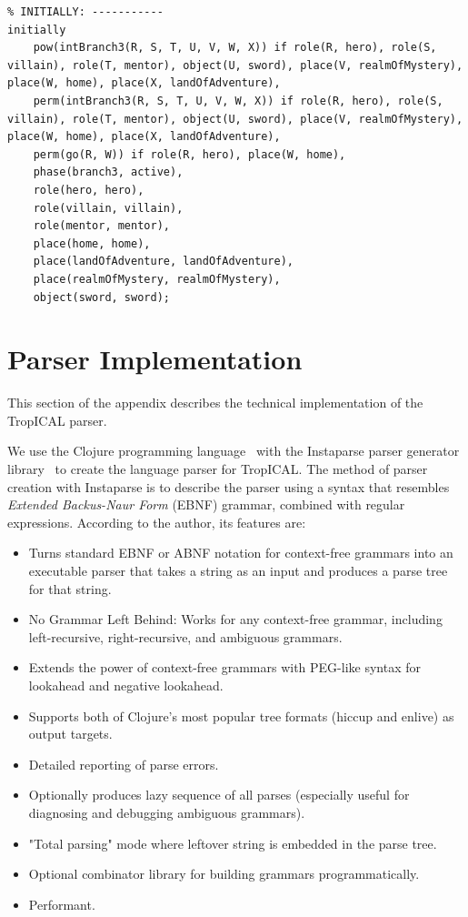 \documentclass[11pt]{report}
\begin{document}
\begin{lstlisting}
% INITIALLY: -----------
initially
    pow(intBranch3(R, S, T, U, V, W, X)) if role(R, hero), role(S, villain), role(T, mentor), object(U, sword), place(V, realmOfMystery), place(W, home), place(X, landOfAdventure),
    perm(intBranch3(R, S, T, U, V, W, X)) if role(R, hero), role(S, villain), role(T, mentor), object(U, sword), place(V, realmOfMystery), place(W, home), place(X, landOfAdventure),
    perm(go(R, W)) if role(R, hero), place(W, home),
    phase(branch3, active),
    role(hero, hero),
    role(villain, villain),
    role(mentor, mentor),
    place(home, home),
    place(landOfAdventure, landOfAdventure),
    place(realmOfMystery, realmOfMystery),
    object(sword, sword);
\end{lstlisting}

\section{Parser Implementation}
\label{appendix:t-grammar}
This section of the appendix describes the technical implementation of the TropICAL parser.

We use the Clojure programming language~\citep{clojure} with the Instaparse
parser generator library~\citep{instaparse} to create the language parser for
TropICAL. The method of parser creation with Instaparse is to describe the
parser using a syntax that resembles \emph{Extended Backus-Naur Form} (EBNF)
grammar, combined with regular expressions. According to the author, its
features are:

\begin{itemize}
\item Turns standard EBNF or ABNF notation for context-free grammars into an executable parser that takes a string as an input and produces a parse tree for that string.
\item No Grammar Left Behind: Works for any context-free grammar, including left-recursive, right-recursive, and ambiguous grammars.
\item Extends the power of context-free grammars with PEG-like syntax for lookahead and negative lookahead.
\item Supports both of Clojure's most popular tree formats (hiccup and enlive) as output targets.
\item Detailed reporting of parse errors.
\item Optionally produces lazy sequence of all parses (especially useful for diagnosing and debugging ambiguous grammars).
\item "Total parsing" mode where leftover string is embedded in the parse tree.
\item Optional combinator library for building grammars programmatically.
\item Performant.
\end{itemize}
\end{document}
